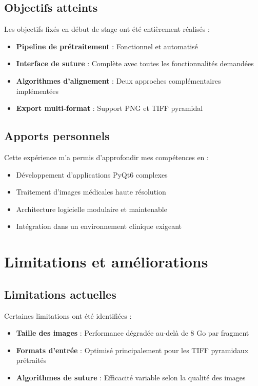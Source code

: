 \documentclass[11pt,a4paper]{report}
\begin{document}
\subsection{Objectifs atteints}

Les objectifs fixés en début de stage ont été entièrement réalisés :

\begin{itemize}
\item \textbf{Pipeline de prétraitement} : Fonctionnel et automatisé
\item \textbf{Interface de suture} : Complète avec toutes les fonctionnalités demandées
\item \textbf{Algorithmes d'alignement} : Deux approches complémentaires implémentées
\item \textbf{Export multi-format} : Support PNG et TIFF pyramidal
\end{itemize}

\subsection{Apports personnels}

Cette expérience m'a permis d'approfondir mes compétences en :

\begin{itemize}
\item Développement d'applications PyQt6 complexes
\item Traitement d'images médicales haute résolution
\item Architecture logicielle modulaire et maintenable
\item Intégration dans un environnement clinique exigeant
\end{itemize}

\section{Limitations et améliorations}

\subsection{Limitations actuelles}

Certaines limitations ont été identifiées :

\begin{itemize}
\item \textbf{Taille des images} : Performance dégradée au-delà de 8 Go par fragment
\item \textbf{Formats d'entrée} : Optimisé principalement pour les TIFF pyramidaux prétraités
\item \textbf{Algorithmes de suture} : Efficacité variable selon la qualité des images
\end{itemize}
\end{document}
